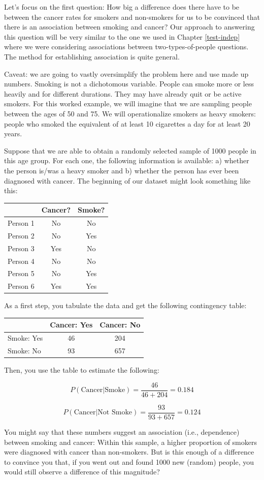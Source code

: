 \documentclass[openany]{book}
\begin{document}
Let's focus on the first question: How big a difference does there have to be between the cancer rates for smokers and non-smokers for us to be convinced that there is an association between smoking and cancer? Our approach to answering this question will be very similar to the one we used in Chapter \ref{test-indep} where we were considering associations between two-types-of-people questions. The method for establishing association is quite general.

Caveat: we are going to vastly oversimplify the problem here and use made up numbers. Smoking is not a dichotomous variable. People can smoke more or less heavily and for different durations. They may have already quit or be active smokers. For this worked example, we will imagine that we are sampling people between the ages of 50 and 75. We will operationalize smokers as heavy smokers: people who smoked the equivalent of at least 10 cigarettes a day for at least 20 years.

Suppose that we are able to obtain a randomly selected sample of 1000 people in this age group. For each one, the following information is available: a) whether the person is/was a heavy smoker and b) whether the person has ever been diagnosed with cancer. The beginning of our dataset might look something like this:

\begin{longtable}[]{@{}lcc@{}}
\toprule
& Cancer? & Smoke?\tabularnewline
\midrule
\endhead
Person 1 & No & No\tabularnewline
Person 2 & No & Yes\tabularnewline
Person 3 & Yes & No\tabularnewline
Person 4 & No & No\tabularnewline
Person 5 & No & Yes\tabularnewline
Person 6 & Yes & Yes\tabularnewline
\bottomrule
\end{longtable}

As a first step, you tabulate the data and get the following contingency table:

\begin{longtable}[]{@{}lcc@{}}
\toprule
& Cancer: Yes & Cancer: No\tabularnewline
\midrule
\endhead
Smoke: Yes & 46 & 204\tabularnewline
Smoke: No & 93 & 657\tabularnewline
\bottomrule
\end{longtable}

Then, you use the table to estimate the following:

\[P(\text{Cancer}|\text{Smoke})=\frac{46}{46+204}=0.184\]

\[P(\text{Cancer}|\text{Not Smoke})=\frac{93}{93+657}=0.124\]

You might say that these numbers suggest an association (i.e., dependence) between smoking and cancer: Within this sample, a higher proportion of smokers were diagnosed with cancer than non-smokers. But is this enough of a difference to convince you that, if you went out and found 1000 new (random) people, you would still observe a difference of this magnitude?
\end{document}
